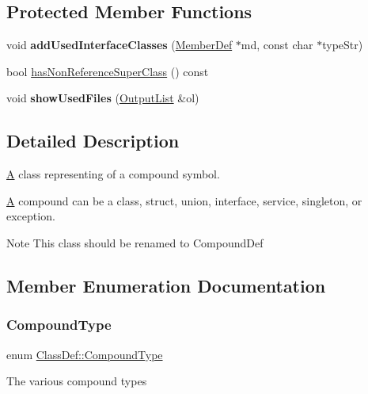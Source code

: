\subsection*{Protected Member Functions}
\begin{DoxyCompactItemize}
\item 
\mbox{\label{class_class_def_a93186f9ffc007c6aa8b8fd620184c928}} 
void {\bfseries add\+Used\+Interface\+Classes} (\mbox{\hyperlink{class_member_def}{Member\+Def}} $\ast$md, const char $\ast$type\+Str)
\item 
bool \mbox{\hyperlink{class_class_def_a80b2ee881adb1fdb06128c27bb8c6da8}{has\+Non\+Reference\+Super\+Class}} () const
\item 
\mbox{\label{class_class_def_aef335dd744f22f66968fbda46d388d29}} 
void {\bfseries show\+Used\+Files} (\mbox{\hyperlink{class_output_list}{Output\+List}} \&ol)
\end{DoxyCompactItemize}


\subsection{Detailed Description}
\mbox{\hyperlink{class_a}{A}} class representing of a compound symbol.

\mbox{\hyperlink{class_a}{A}} compound can be a class, struct, union, interface, service, singleton, or exception. \begin{DoxyNote}{Note}
This class should be renamed to Compound\+Def 
\end{DoxyNote}


\subsection{Member Enumeration Documentation}
\mbox{\label{class_class_def_ae70cf86d35fe954a94c566fbcfc87939}} 
\subsubsection{\texorpdfstring{CompoundType}{CompoundType}}
{\footnotesize\ttfamily enum \mbox{\hyperlink{class_class_def_ae70cf86d35fe954a94c566fbcfc87939}{Class\+Def\+::\+Compound\+Type}}}

The various compound types 

